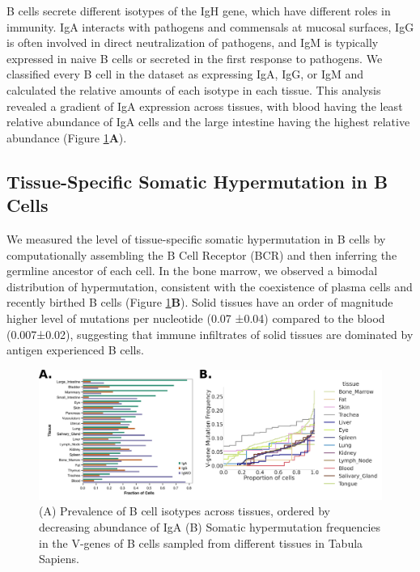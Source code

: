 B cells secrete different isotypes of the IgH gene, which have different roles in immunity. IgA interacts with pathogens and commensals at mucosal surfaces, IgG is often involved in direct neutralization of pathogens, and IgM is typically expressed in naive B cells or secreted in the first response to pathogens. We classified every B cell in the dataset as expressing IgA, IgG, or IgM and calculated the relative amounts of each isotype in each tissue. This analysis revealed a gradient of IgA expression across tissues, with blood having the least relative abundance of IgA cells and the large intestine having the highest relative abundance (Figure \ref{fig:TabulaSapiens_igh}\textbf{A}).

\subsection{Tissue-Specific Somatic Hypermutation in B Cells}

We measured the level of tissue-specific somatic hypermutation in B cells by computationally assembling the B Cell Receptor (BCR) and then inferring the germline ancestor of each cell\cite{lindeman2018bracer,gupta2015change}. In the bone marrow, we observed a bimodal distribution of hypermutation, consistent with the coexistence of plasma cells and recently birthed B cells (Figure \ref{fig:TabulaSapiens_igh}\textbf{B}). Solid tissues have an order of magnitude higher level of mutations per nucleotide (0.07 ±0.04) compared to the blood (0.007±0.02), suggesting that immune infiltrates of solid tissues are dominated by antigen experienced B cells.

\begin{figure}[hbt!]
\centering
\includegraphics[width=14cm, keepaspectratio]{figs/TabulaSapiens/fig3_tabula_igh.png}
\caption[Tissue population-level parameters of B cell Dynamics.]{(A) Prevalence of B cell isotypes across tissues, ordered by decreasing abundance of IgA (B) Somatic hypermutation frequencies in the V-genes of B cells sampled from different tissues in
Tabula Sapiens.}
\label{fig:TabulaSapiens_igh}
\end{figure}

